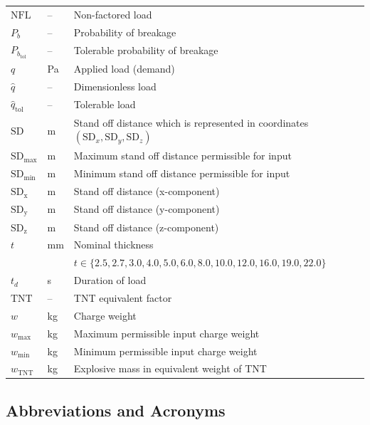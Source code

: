\documentclass[12pt]{article}
\begin{document}
\begin{longtable}{l l p{12cm}}
  $\text{NFL} $ & -- & Non-factored load\\
  $P_b$ & -- &  Probability of breakage\\
  $P_{b_{\text{tol}}}$ & -- &  Tolerable probability of breakage\\
  $q$ & \si{\pascal} & Applied load (demand)\\
  $\hat{q}$ & -- & Dimensionless load\\
  $\hat{q}_{\text{tol}}$ & -- & Tolerable load\\  
  $\text{SD}$ & \si{\meter} & Stand off distance which is represented in
                              coordinates $(\text{SD}_x , \text{SD}_y ,
                              \text{SD}_z)$\\
  $\text{SD}_{\text{max}} $ & \si{\meter} & Maximum stand off distance
                                            permissible for input\\
  $\text{SD}_{\text{min}} $ & \si{\meter} & Minimum stand off distance
                                            permissible for input\\
  $\text{SD}_{\text{x}} $ & \si{\meter} & Stand off distance (x-component)\\
  $\text{SD}_{\text{y}} $ & \si{\meter} & Stand off distance (y-component)\\  
  $\text{SD}_{\text{z}} $ & \si{\meter} & Stand off distance (z-component)\\
  $t$ & \si{\milli\meter} &  Nominal thickness \\
      &                   &  $t \in
                            \{2.5, 2.7, 3.0, 4.0, 5.0, 6.0, 8.0, 10.0,
                            12.0, 16.0, 19.0, 22.0\}$\\
  $t_d$ & s & Duration of load\\
  $\text{TNT} $ & -- & TNT equivalent factor\\
  $w$ & \si{\kilo\gram} & Charge weight\\
  $w_{\text{max}}$ & \si{\kilo\gram} & Maximum permissible input charge weight\\
  $w_{\text{min}}$ & \si{\kilo\gram} & Minimum permissible input charge weight\\
  $w_{\text{TNT}}$& \si{\kilo\gram} & Explosive mass in equivalent weight of TNT\\
  \bottomrule
\end{longtable}

\subsection{Abbreviations and Acronyms}
\end{document}
